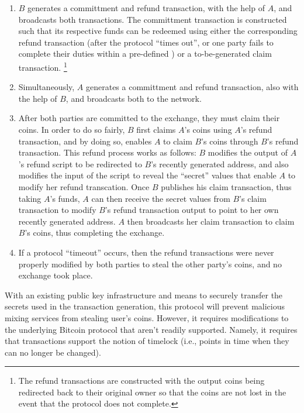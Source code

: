 \begin{enumerate}
	\item $B$ generates a committment and refund transaction, with the help of $A$, and broadcasts both transactions. The committment transaction is constructed such that its respective funds can be redeemed using either the corresponding refund transaction (after the protocol ``times out'', or one party fails to complete their duties within a pre-defined ) or a to-be-generated claim transaction. \footnote{The refund transactions are constructed with the output coins being redirected back to their original owner so that the coins are not lost in the event that the protocol does not complete.}
	\item Simultaneously, $A$ generates a committment and refund transaction, also with the help of $B$, and broadcasts both to the network. 
	\item After both parties are committed to the exchange, they must claim their coins. In order to do so fairly, $B$ first claims $A$'s coins using $A$'s refund transaction, and by doing so, enables $A$ to claim $B$'s coins through $B$'s refund transaction. This refund process works as follows: $B$ modifies the output of $A$'s refund script to be redirected to $B$'s recently generated address, and also modifies the input of the script to reveal the ``secret'' values that enable $A$ to modify her refund transcation. Once $B$ publishes his claim transaction, thus taking $A$'s funds, $A$ can then receive the secret values from $B$'s claim transaction to modify $B$'s refund transaction output to point to her own recently generated address. $A$ then broadcasts her claim transaction to claim $B$'s coins, thus completing the exchange.
	\item If a protocol ``timeout'' occurs, then the refund transactions were never properly modified by both parties to steal the other party's coins, and no exchange took place. 
\end{enumerate}
With an existing public key infrastructure and means to securely transfer the secrets used in the transaction generation, this protocol will prevent malicious mixing services from stealing user's coins. However, it requires modifications to the underlying Bitcoin protocol that aren't readily supported. Namely, it requires that transactions support the notion of timelock (i.e., points in time when they can no longer be changed). 

